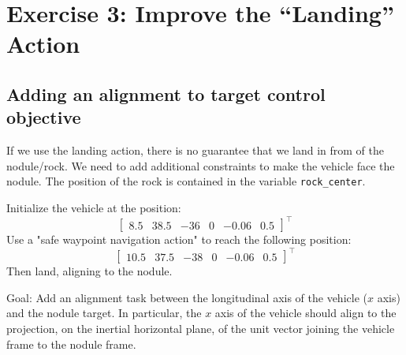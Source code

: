 \documentclass{article}
\begin{document}
 
\clearpage

\section{Exercise 3: Improve the “Landing” Action}
\subsection{Adding an alignment to target control objective}
If we use the landing action, there is no guarantee that we land in from of the nodule/rock. We need to add additional constraints to make the vehicle face the nodule. The position of the rock is contained in the variable \texttt{rock\_center}. 

Initialize the vehicle at the position:
\begin{displaymath}
\begin{bmatrix} 8.5 & 38.5 & -36 & 0 & -0.06 & 0.5 \end{bmatrix}^\top
\end{displaymath} 
Use a "safe waypoint navigation action" to reach the following position: 
\begin{displaymath}
\begin{bmatrix} 10.5 & 37.5 & -38 & 0 & -0.06 & 0.5 \end{bmatrix}^\top
\end{displaymath} 
Then land, aligning to the nodule.

Goal: Add an alignment task between the longitudinal axis of the vehicle ($x$ axis) and the nodule target. In particular, the $x$ axis of the vehicle should align to the projection, on the inertial horizontal plane, of the unit vector joining the vehicle frame to the nodule frame.
\end{document}

